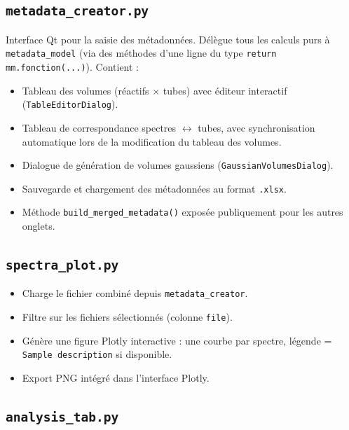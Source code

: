 \documentclass[12pt, a4paper]{article}
\begin{document}
\subsection{\texttt{metadata\_creator.py}}

Interface Qt pour la saisie des métadonnées. Délègue tous les calculs purs
à \texttt{metadata\_model} (via des méthodes d'une ligne du type
\texttt{return mm.fonction(...)}). Contient :

\begin{itemize}
  \item Tableau des volumes (réactifs $\times$ tubes) avec éditeur interactif
        (\texttt{TableEditorDialog}).
  \item Tableau de correspondance spectres $\leftrightarrow$ tubes, avec
        synchronisation automatique lors de la modification du tableau des
        volumes.
  \item Dialogue de génération de volumes gaussiens
        (\texttt{GaussianVolumesDialog}).
  \item Sauvegarde et chargement des métadonnées au format \texttt{.xlsx}.
  \item Méthode \texttt{build\_merged\_metadata()} exposée publiquement pour
        les autres onglets.
\end{itemize}

\subsection{\texttt{spectra\_plot.py}}

\begin{itemize}
  \item Charge le fichier combiné depuis \texttt{metadata\_creator}.
  \item Filtre sur les fichiers sélectionnés (colonne \texttt{file}).
  \item Génère une figure Plotly interactive : une courbe par spectre,
        légende = \texttt{Sample description} si disponible.
  \item Export PNG intégré dans l'interface Plotly.
\end{itemize}

\subsection{\texttt{analysis\_tab.py}}
\end{document}

